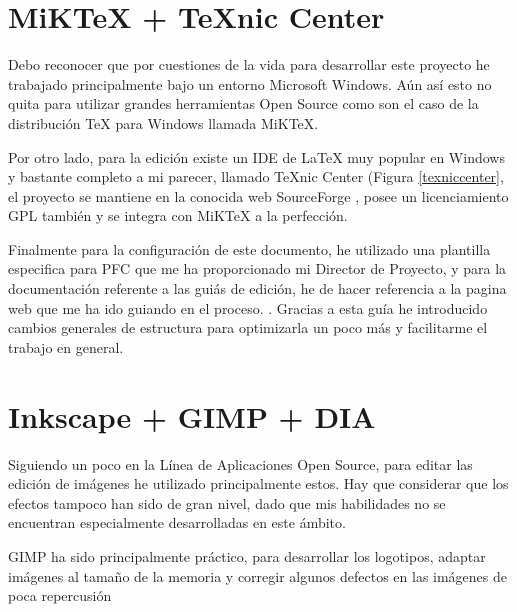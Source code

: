 
\section*{MiK\TeX{}  + \TeX nic Center}

Debo reconocer que por cuestiones de la vida para desarrollar este proyecto he trabajado principalmente bajo un entorno Microsoft Windows. Aún así esto no quita para utilizar grandes herramientas Open Source como son el caso de la distribución \TeX{} para Windows llamada MiK\TeX \cite{website:miktex}. 

Por otro lado, para la edición existe un IDE de \LaTeX{} muy popular en Windows y bastante completo a mi parecer, llamado \TeX nic Center (Figura \ref{texniccenter}, el proyecto se mantiene en la conocida web SourceForge \cite{website:sourceforge}, posee un licenciamiento GPL también y se integra con MiK\TeX{} a la perfección.

Finalmente para la configuración de este documento, he utilizado una plantilla especifica para PFC que me ha proporcionado mi Director de Proyecto, y para la documentación referente a las guiás de edición, he de hacer referencia a la pagina web que me ha ido guiando en el proceso. \cite{website:latex}. Gracias a esta guía he introducido cambios generales de estructura para optimizarla un poco más y facilitarme el trabajo en general.


\section*{Inkscape + GIMP + DIA}

Siguiendo un poco en la Línea de Aplicaciones Open Source, para editar las edición de imágenes he utilizado principalmente estos. Hay que considerar que los efectos tampoco han sido de gran nivel, dado que mis habilidades no se encuentran especialmente desarrolladas en este ámbito.

GIMP \cite{website:gimp} ha sido principalmente práctico, para desarrollar los logotipos, adaptar imágenes al tamaño de la memoria y corregir algunos defectos en las imágenes de poca repercusión


